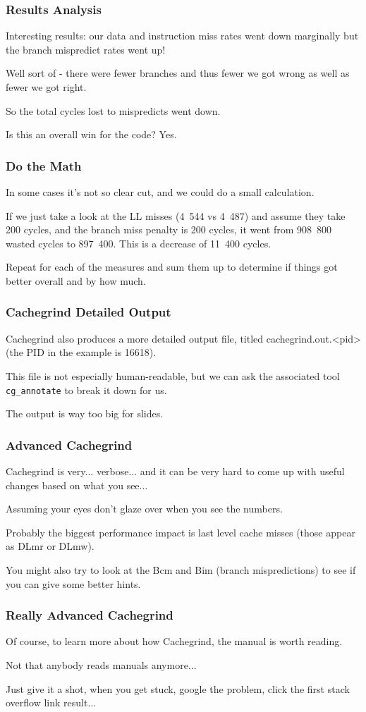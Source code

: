 \begin{frame}
\frametitle{Results Analysis}


Interesting results: our data and instruction miss rates went down marginally but the branch mispredict rates went up!

Well sort of - there were fewer branches and thus fewer we got wrong as well as fewer we got right. 

So the total cycles lost to mispredicts went down. 

Is this an overall win for the code? Yes. 


\end{frame}
\begin{frame}
\frametitle{Do the Math}

In some cases it's not so clear cut, and we could do a small calculation. 

If we just take a look at the LL misses (4~544 vs 4~487) and assume they take 200 cycles, and the branch miss penalty is 200 cycles, it went from 908~800 wasted cycles to 897~400. This is a decrease of 11~400 cycles.

  Repeat for each of the measures and sum them up to determine if things got better overall and by how much.

\end{frame}
\begin{frame}
\frametitle{Cachegrind Detailed Output}

Cachegrind also produces a more detailed output file, titled cachegrind.out.<pid> (the PID in the example is 16618). 

This file is not especially human-readable, but we can ask the associated tool \texttt{cg\_annotate} to break it down for us.

The output is way too big for slides.

\end{frame}
\begin{frame}
\frametitle{Advanced Cachegrind}

Cachegrind is very... verbose... and it can be very hard to come up with useful changes based on what you see... 

Assuming your eyes don't glaze over when you see the numbers. 

Probably the biggest performance impact is last level cache misses (those appear as DLmr or DLmw). 

You might also try to look at the Bcm and Bim (branch mispredictions) to see if you can give some better hints. 
\end{frame}
\begin{frame}
\frametitle{Really Advanced Cachegrind}

Of course, to learn more about how Cachegrind, the manual is worth reading. 

Not that anybody reads manuals anymore... 

Just give it a shot, when you get stuck, google the problem, click the first stack overflow link result...


\end{frame}




